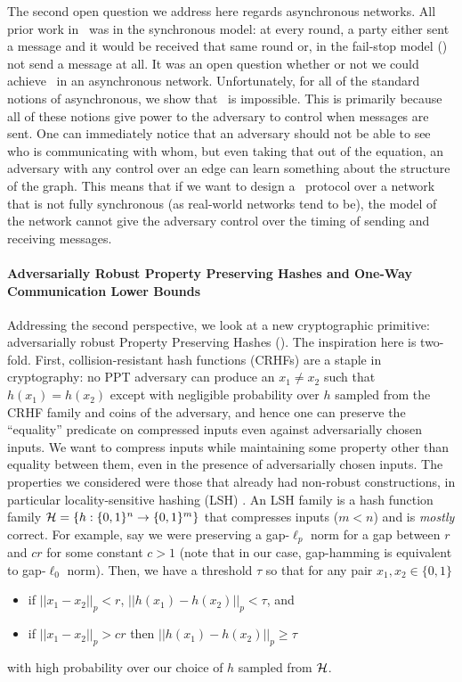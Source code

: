 The second open question we address here regards asynchronous networks. All prior work in \THC~was in the synchronous model: at every round, a party either sent a message and it would be received that same round or, in the fail-stop model (\cite{BBMM18,LLMMMT18}) not send a message at all. It was an open question whether or not we could achieve \THC~in an asynchronous network. Unfortunately, for all of the standard notions of asynchronous, we show that \THC~is impossible. This is primarily because all of these notions give power to the adversary to control when messages are sent. One can immediately notice that an adversary should not be able to see who is communicating with whom, but even taking that out of the equation, an adversary with any control over an edge can learn something about the structure of the graph. This means that if we want to design a \THC~protocol over a network that is not fully synchronous (as real-world networks tend to be), the model of the network cannot give the adversary control over the timing of sending and receiving messages.

\paragraph{Adversarially Robust Property Preserving Hashes and One-Way Communication Lower Bounds}
Addressing the second perspective, we look at a new cryptographic primitive: adversarially robust Property Preserving Hashes (\PPH). The inspiration here is two-fold. First, collision-resistant hash functions (CRHFs) are a staple in cryptography: no PPT adversary can produce an $x_1 \neq x_2$ such that $h(x_1) = h(x_2)$ except with negligible probability over $h$ sampled from the CRHF family and coins of the adversary, and hence one can preserve the ``equality'' predicate on compressed inputs even against adversarially chosen inputs. We want to compress inputs while maintaining some property other than equality between them, even in the presence of adversarially chosen inputs. The properties we considered were those that already had non-robust constructions, in particular locality-sensitive hashing (LSH) \cite{IndykM98}. An LSH family is a hash function family ${\cal H} = \{ h:\{0,1\}^n \to \{0,1\}^m \}$ that compresses inputs ($m < n$) and is \emph{mostly} correct. For example, say we were preserving a gap-$\ell_p$ norm for a gap between $r$ and $cr$ for some constant $c > 1$ (note that in our case, gap-hamming is equivalent to gap-$\ell_0$ norm). Then, we have a threshold $\tau$ so that for any pair $x_1, x_2 \in \{0,1\}$
\begin{itemize}
	\item if $||x_1 - x_2||_p < r$, $||h(x_1) - h(x_2)||_p < \tau$, and
	\item if $||x_1 - x_2||_p > cr$ then $||h(x_1) - h(x_2)||_p \ge \tau$
\end{itemize}
with high probability over our choice of $h$ sampled from ${\cal H}$.

